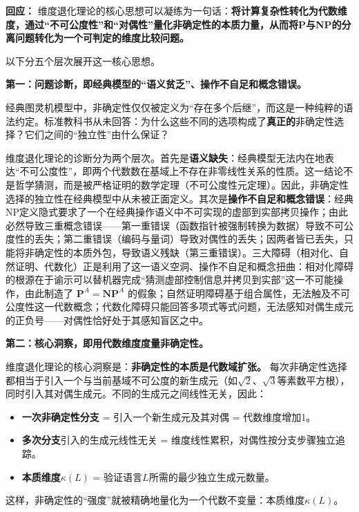 \documentclass{ctexart}
\begin{document}
	\textbf{回应：} 维度退化理论的核心思想可以凝练为一句话：\textbf{将计算复杂性转化为代数维度，通过``不可公度性''和``对偶性''量化非确定性的本质力量，从而将P与NP的分离问题转化为一个可判定的维度比较问题。}
	
	以下分五个层次展开这一核心思想。
	
	\textbf{第一：问题诊断，即经典模型的``语义贫乏''、操作不自足和概念错误。}
	
	经典图灵机模型中，非确定性仅仅被定义为``存在多个后继''，而这是一种纯粹的语法约定。标准教科书从未回答：为什么这些不同的选项构成了\textbf{真正的}非确定性选择？它们之间的``独立性''由什么保证？
	
	维度退化理论的诊断分为两个层次。首先是\textbf{语义缺失}：经典模型无法内在地表达``不可公度性''，即两个代数数在基域上不存在非零线性关系的性质。这一结论不是哲学猜测，而是被严格证明的数学定理（不可公度性元定理）。因此，非确定性选择的独立性在经典模型中从未被正面定义。其次是\textbf{操作不自足和概念错误}：经典NP定义隐式要求了一个在经典操作语义中不可实现的虚部到实部拷贝操作；由此必然导致三重概念错误——第一重错误（函数指针被强制转换为数据）导致不可公度性的丢失；第二重错误（编码与量词）导致对偶性的丢失；因两者皆已丢失，只能将非确定性的本质外包，导致语义残缺（第三重错误）。三大障碍（相对化、自然证明、代数化）正是利用了这一语义空洞、操作不自足和概念扭曲：相对化障碍的根源在于谕示可以替机器完成“猜测虚部控制信息并拷贝到实部”这一不可能操作，由此制造了 $\mathbf{P}^A = \mathbf{NP}^A$ 的假象；自然证明障碍基于组合属性，无法触及不可公度性这一代数概念；代数化障碍只能回答多项式等式问题，无法感知对偶生成元的正负号——对偶性恰好处于其感知盲区之中。
	
	\textbf{第二：核心洞察，即用代数维度度量非确定性。}
	
	维度退化理论的核心洞察是：\textbf{非确定性的本质是代数域扩张。} 每次非确定性选择都相当于引入一个与当前基域不可公度的新生成元（如$\sqrt{2}$、$\sqrt{3}$等素数平方根），同时引入其对偶生成元。不同的生成元之间线性无关，因此：
	
	\begin{itemize}
		\item \textbf{一次非确定性分支} = 引入一个新生成元及其对偶 = 代数维度增加1。
		\item \textbf{多次分支}引入的生成元线性无关 = 维度线性累积，对偶性按分支步骤独立追踪。
		\item \textbf{本质维度$\kappa(L)$} = 验证语言$L$所需的最少独立生成元数量。
	\end{itemize}
	
	这样，非确定性的``强度''就被精确地量化为一个代数不变量：本质维度$\kappa(L)$。
	
\end{document}
